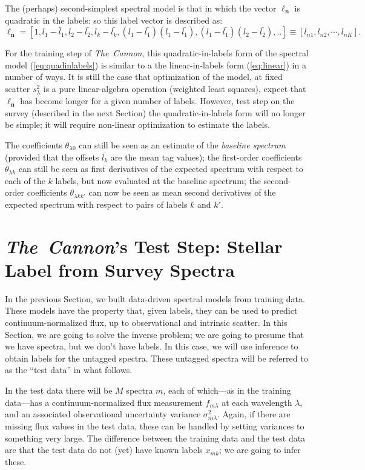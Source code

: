 \documentclass[12pt, preprint]{aastex}
\newcommand{\set}[1]{\bm{#1}}
\newcommand{\mean}[1]{\overline{#1}}
\newcommand{\tc}{\textsl{The~Cannon}}
\begin{document}
The (perhaps) second-simplest spectral model is that in which the
vector $\set{\ell_n}$ is quadratic in the labels: so this label vector is described as:
\begin{equation}
\set{\ell_n} =  [1, l_1 - \bar{l}_1, l_2 - \bar{l_2}, l_k - \bar{l_k}, (l_1 - \bar{l_1})(l_1 - \bar{l_1}), (l_1 - \bar{l_1})(l_2 - \bar{l_2}), .. ] \equiv [l_{n1}, l_{n2}, \cdots, l_{nK}].
\label{eq:quadinlabels}
\end{equation}

For the training step of \tc , this quadratic-in-labels form  of the spectral model (\ref{eq:quadinlabels}) is similar to a the linear-in-labels form (\ref{eq:linear}) in a number
of ways.
It is still the case that optimization of the model, at fixed scatter
$s_\lambda^2$ is a pure linear-algebra operation (weighted least
squares), expect that $\set{\ell_n}$ has become longer for a given number of labels. 
However, test step on the survey (described in the next Section) the quadratic-in-labels form
 will no longer be simple; it will require non-linear
optimization to estimate the labels.

The coefficients $\theta_{\lambda 0}$ can still be seen as an estimate of the
\emph{baseline spectrum} (provided that the offsets $\mean{l_k}$ are the
mean tag values); the first-order coefficients $\theta_{\lambda k}$ can still
be seen as first derivatives of the expected spectrum with respect to
each of the $k$ labels, but now evaluated at the baseline spectrum; the
second-order coefficients $\theta_{\lambda kk'}$ can now be seen as mean
second derivatives of the expected spectrum with respect to pairs of
labels $k$ and $k'$.

\section{\tc's Test Step: Stellar Label from Survey Spectra}
\label{sec:paramestimate}

In the previous Section, we built data-driven spectral models from training data.
These models have the property that, given labels, they can be used to
predict continuum-normalized flux, up to observational and intrinsic
scatter.
In this Section, we are going to solve the inverse problem; we
are going to presume that we have spectra, but we don't have labels.
In this case, we will use inference to obtain labels for the untagged
spectra.
These untagged spectra will be referred to as the ``test data'' in
what follows.

In the test data there will be $M$ spectra $m$, each of which---as in
the training data---has a continuum-normalized flux measurement
$f_{m\lambda}$ at each wavelength $\lambda$, and an
associated observational uncertainty variance $\sigma_{m\lambda}^2$.
Again, if there are missing flux values in the test data, these can be
handled by setting variances to something very large.
The difference between the training data and the test data are that the
test data do not (yet) have known labels $x_{mk}$; we are going to infer
these.
\end{document}
